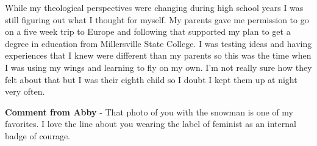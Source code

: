 While my theological perspectives were changing during high school years I was still figuring out what I thought for myself.
My parents gave me permission to go on a five week trip to Europe and following that supported my plan to get a degree in education from Millersville State College.
I was testing ideas and having experiences that I knew were different than my parents so this was the time when I was using my wings and learning to fly on my own.
I'm not really sure how they felt about that but I was their eighth child so I doubt I kept them up at night very often.

\textbf{Comment from Abby} - That photo of you with the snowman is one of my favorites.
I love the line about you wearing the label of feminist as an internal badge of courage.
